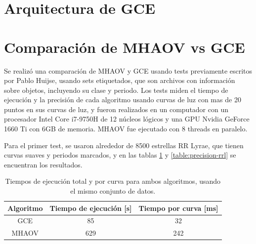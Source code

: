 \begin{algorithm}[H]
\begin{algorithmic}
\end{algorithmic}
\end{algorithm}

\section{Arquitectura de GCE}\label{sec:gce}
\section{Comparación de MHAOV vs GCE}\label{sec:mhaov-vs-gce}
Se realizó una comparación de MHAOV y GCE usando tests previamente escritos por Pablo Huijse, usando sets etiquetados, que son archivos con información sobre objetos, incluyendo su clase y periodo. Los tests miden el tiempo de ejecución y la precisión de cada algoritmo usando curvas de luz con mas de 20 puntos en sus curvas de luz, y fueron realizados en un computador con un procesador Intel Core i7-9750H de 12 núcleos lógicos y una GPU Nvidia GeForce 1660 Ti con 6GB de memoria. MHAOV fue ejecutado con $8$ threads en paralelo.

Para el primer test, se usaron alrededor de 8500 estrellas RR Lyrae, que tienen curvas suaves y periodos marcados, y en las tablas \ref{table:tiempos-rrl} y \ref{table:precision-rrl} se encuentran los resultados.
\begin{table}[H]
\caption{Tiempos de ejecución total y por curva para ambos algoritmos, usando el mismo conjunto de datos.}
    \begin{tabular}{|c|c|c|}
    \hline
    Algoritmo & Tiempo de ejecución {[}s{]} & Tiempo por curva {[}ms{]} \\ \hline
    GCE       & 85                          & 32                        \\ \hline
    MHAOV     & 629                         & 242                       \\ \hline
    \end{tabular}
    \label{table:tiempos-rrl}
\end{table}


